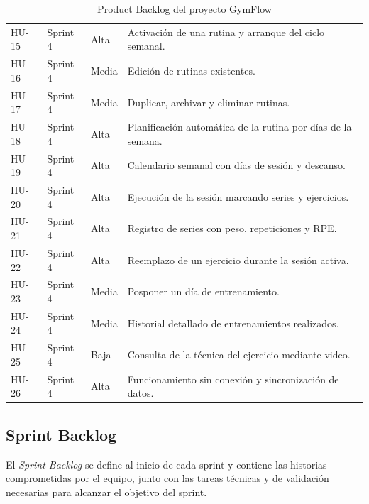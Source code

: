 \begin{table}[H]
\begin{tabularx}{0.98\textwidth}{L{2.1cm} L{2cm} L{1.8cm} Y}
HU-15 & Sprint 4 & Alta & Activación de una rutina y arranque del ciclo semanal. \\
HU-16 & Sprint 4 & Media & Edición de rutinas existentes. \\
HU-17 & Sprint 4 & Media & Duplicar, archivar y eliminar rutinas. \\
HU-18 & Sprint 4 & Alta & Planificación automática de la rutina por días de la semana. \\
HU-19 & Sprint 4 & Alta & Calendario semanal con días de sesión y descanso. \\
HU-20 & Sprint 4 & Alta & Ejecución de la sesión marcando series y ejercicios. \\
HU-21 & Sprint 4 & Alta & Registro de series con peso, repeticiones y RPE. \\
HU-22 & Sprint 4 & Alta & Reemplazo de un ejercicio durante la sesión activa. \\
HU-23 & Sprint 4 & Media & Posponer un día de entrenamiento. \\
HU-24 & Sprint 4 & Media & Historial detallado de entrenamientos realizados. \\
HU-25 & Sprint 4 & Baja & Consulta de la técnica del ejercicio mediante video. \\
HU-26 & Sprint 4 & Alta & Funcionamiento sin conexión y sincronización de datos. \\
\bottomrule
\end{tabularx}
\caption{Product Backlog del proyecto GymFlow}
\end{table}

\subsection{Sprint Backlog}

El \textit{Sprint Backlog} se define al inicio de cada sprint y contiene las historias comprometidas por el equipo, junto con las tareas técnicas y de validación necesarias para alcanzar el objetivo del sprint.

